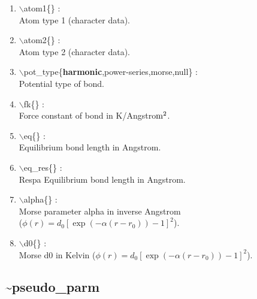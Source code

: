 \documentclass[12pt,titlepage]{article}
\begin{document}
\begin{enumerate}

 \vspace{0.15in} 
 \item  $\backslash$atom1\{\} : \\
    Atom type 1 (character data).
   
 \vspace{0.15in} 
 \item  $\backslash$atom2\{\} : \\ 
    Atom type 2 (character data).

 \vspace{0.15in} 
 \item  $\backslash$pot\_type\{{\bf harmonic},power-series,morse,null\} : \\
     Potential type of bond.

 \vspace{0.15in} 
 \item  $\backslash$fk\{\} : \\
     Force constant of bond in K/Angstro${\rm m}^2$.

 \vspace{0.15in} 
 \item  $\backslash$eq\{\} : \\
    Equilibrium bond length in Angstrom.

 \vspace{0.15in} 
 \item  $\backslash$eq\_res\{\} : \\
     Respa Equilibrium bond length in Angstrom.

 \vspace{0.15in} 
 \item  $\backslash$alpha\{\} : \\
    Morse parameter alpha in inverse Angstrom \\
    ($\phi(r) = d_0[\exp(-\alpha(r-r_0))-1]^2$).

 \vspace{0.15in} 
 \item  $\backslash$d0\{\} : \\
    Morse d0 in Kelvin
    ($\phi(r) = d_0[\exp(-\alpha(r-r_0))-1]^2$).

\end{enumerate}

\newpage
\subsection*{\bf \~{}pseudo\_parm}
\end{document}
